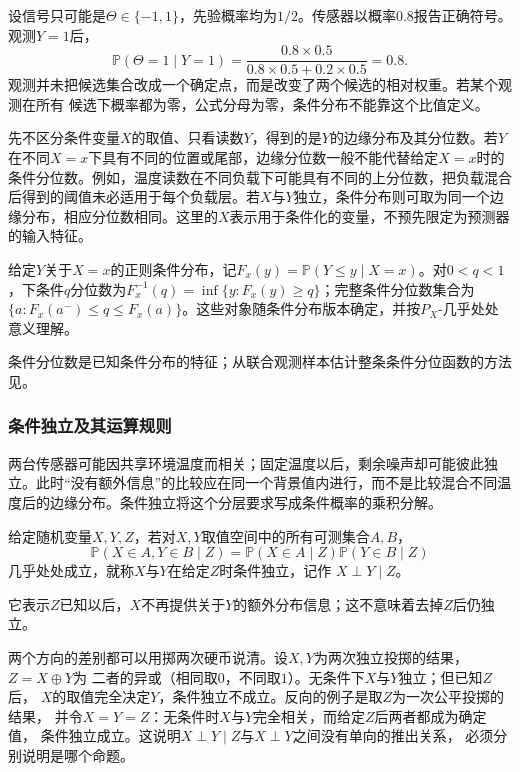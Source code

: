 \begin{example}[有限候选经过带噪观测更新]
\label{ex:probability-finite-candidate-bayes}
设信号只可能是\(\Theta\in\{-1,1\}\)，先验概率均为\(1/2\)。传感器以概率\(0.8\)报告正确符号。观测\(Y=1\)后，
\[ \mathbb{P}(\Theta=1\mid Y=1)
  =\frac{0.8\times0.5}{0.8\times0.5+0.2\times0.5}=0.8. \]
观测并未把候选集合改成一个确定点，而是改变了两个候选的相对权重。若某个观测在所有
候选下概率都为零，公式分母为零，条件分布不能靠这个比值定义。
\end{example}
先不区分条件变量\(X\)的取值、只看读数\(Y\)，得到的是\(Y\)的边缘分布及其分位数。若\(Y\)在不同\(X=x\)下具有不同的位置或尾部，边缘分位数一般不能代替给定\(X=x\)时的条件分位数。例如，温度读数在不同负载下可能具有不同的上分位数，把负载混合后得到的阈值未必适用于每个负载层。若\(X\)与\(Y\)独立，条件分布则可取为同一个边缘分布，相应分位数相同。这里的\(X\)表示用于条件化的变量，不预先限定为预测器的输入特征。
\begin{definition}[条件分位数]
  \label{def:statistics-conditional-quantile}
给定\(Y\)关于\(X=x\)的正则条件分布，记\(F_x(y)=\mathbb P(Y\leq y\mid X=x)\)。对\(0<q<1\)，下条件\(q\)分位数为\(F_x^{-1}(q)=\inf\{y:F_x(y)\geq q\}\)；完整条件分位数集合为\(\{a:F_x(a^-)\leq q\leq F_x(a)\}\)。这些对象随条件分布版本确定，并按\(P_X\)-几乎处处意义理解。
\end{definition}
条件分位数是已知条件分布的特征；从联合观测样本估计整条条件分位函数的方法见。

\subsubsection{条件独立及其运算规则}
两台传感器可能因共享环境温度而相关；固定温度以后，剩余噪声却可能彼此独立。此时“没有额外信息”的比较应在同一个背景值内进行，而不是比较混合不同温度后的边缘分布。条件独立将这个分层要求写成条件概率的乘积分解。
\begin{definition}[条件独立]
  \label{def:probability-conditional-independence}
  给定随机变量\(X,Y,Z\)，若对\(X,Y\)取值空间中的所有可测集合\(A,B\)，
\[ \mathbb{P}(X\in A,Y\in B\mid Z)
  =\mathbb{P}(X\in A\mid Z)\mathbb{P}(Y\in B\mid Z) \]
几乎处处成立，就称\(X\)与\(Y\)在给定\(Z\)时条件独立，记作
\(X\perp Y\mid Z\)。
\end{definition}
它表示\(Z\)已知以后，\(X\)不再提供关于\(Y\)的额外分布信息；这不意味着去掉\(Z\)后仍独立。

两个方向的差别都可以用掷两次硬币说清。设\(X,Y\)为两次独立投掷的结果，\(Z=X\oplus Y\)为
二者的异或（相同取\(0\)，不同取\(1\)）。无条件下\(X\)与\(Y\)独立；但已知\(Z\)后，
\(X\)的取值完全决定\(Y\)，条件独立不成立。反向的例子是取\(Z\)为一次公平投掷的结果，
并令\(X=Y=Z\)：无条件时\(X\)与\(Y\)完全相关，而给定\(Z\)后两者都成为确定值，
条件独立成立。这说明\(X\perp Y\mid Z\)与\(X\perp Y\)之间没有单向的推出关系，
必须分别说明是哪个命题。

